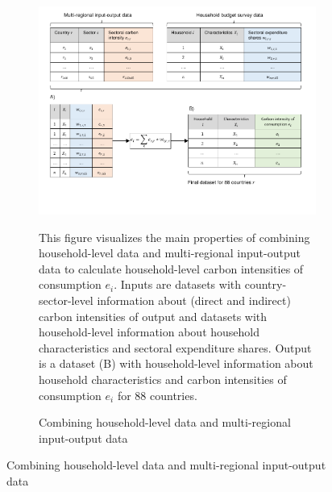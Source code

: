 \begin{figure}[ht!]
  \centering
  \caption{Graphical representation of data work} \label{fig:data_visualisation}
  \begin{subfigure}[b]{\textwidth}
  \centering
  \includegraphics{1_Figures/Figures_Appendix/Graphical representation of data work_1.pdf}
  \caption{Combining household-level data and multi-regional input-output data} \label{fig:data_visualisation_1}
  \begin{subcaption2}
    This figure visualizes the main properties of combining household-level data and multi-regional input-output data to calculate household-level carbon intensities of consumption $e_{i}$. Inputs are datasets with country-sector-level information about (direct and indirect) carbon intensities of output and datasets with household-level information about household characteristics and sectoral expenditure shares. Output is a dataset (B) with household-level information about household characteristics and carbon intensities of consumption $e_{i}$ for 88 countries.
  \end{subcaption2}
  \end{subfigure}
\end{figure}

\clearpage

